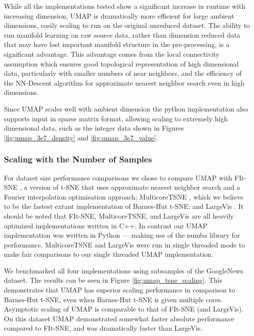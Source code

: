 \documentclass[12pt]{article}
\begin{document}
While all the implementations tested show a significant increase in runtime with increasing dimension, UMAP is dramatically more efficient for large ambient dimensions, easily scaling to run on the original unreduced dataset. The ability to run manifold learning on raw source data, rather than dimension reduced data that may have lost important manifold structure in the pre-processing, is a significant advantage. This advantage comes from the local connectivity assumption which ensures good topological representation of high dimensional data, particularly with smaller numbers of near neighbors, and the efficiency of the NN-Descent algorithm for approximate nearest neighbor search even in high dimensions.

Since UMAP scales well with ambient dimension the python implementation also supports input in sparse matrix format, allowing scaling to extremely high dimensional data, such as the integer data shown in Figures \ref{fig:umap_3e7_density} and \ref{fig:umap_3e7_value}.

\subsubsection{Scaling with the Number of Samples}\label{data_scaling}

For dataset size performance comparisons we chose to compare UMAP with FIt-SNE \cite{linderman2017efficient}, a version of t-SNE that uses approximate nearest neighbor search and a Fourier interpolation optimisation approach; MulticoreTSNE \cite{Ulyanov2016}, which we believe to be the fastest extant implementation of Barnes-Hut t-SNE; and LargeVis \cite{tang2016visualizing}. It should be noted that FIt-SNE, MulticoreTSNE, and LargeVis are all heavily optimized implementations written in C++. In contrast our UMAP implementation was written in Python --- making use of the numba \cite{Lam:2015:NLP:2833157.2833162} library for performance. MulticoreTSNE and LargeVis were run in single threaded mode to make fair comparisons to our single threaded UMAP implementation.

We benchmarked all four implementations using subsamples of the GoogleNews dataset. The results can be seen in Figure \ref{fig:umap_tsne_scaling}. This demonstrates that UMAP has superior scaling performance in comparison to Barnes-Hut t-SNE, even when Barnes-Hut t-SNE is given multiple cores. Asymptotic scaling of UMAP is comparable to that of FIt-SNE (and LargeVis). On this dataset UMAP demonstrated somewhat faster absolute performance compared to FIt-SNE, and was dramatically faster than LargeVis.
\end{document}
